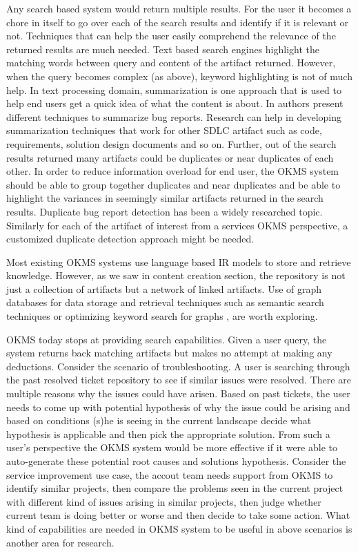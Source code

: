 Any search based system would return multiple results. For the user it becomes a chore in itself to go over each of the search results and identify if it is relevant or not. Techniques that can help the user easily comprehend the relevance of the returned results are much needed. Text based search engines highlight the matching words between query and content of the artifact returned. However, when the query becomes complex (as above), keyword highlighting is not of much help. In text processing domain, summarization is one approach that is used to help end users get a quick idea of what the content is about. In \cite{Mani:2012,Rastkar:2010} authors present different techniques to summarize bug reports. Research can help in developing summarization techniques that work for other SDLC artifact such as code, requirements, solution design documents and so on. Further, out of the search results returned many artifacts could be duplicates or near duplicates of each other. In order to reduce information overload for end user, the OKMS system should be able to group together duplicates and near duplicates and be able to highlight the variances in seemingly similar artifacts returned in the search results. Duplicate bug report detection \cite{wang2008approach,sun2010discriminative} has been a widely researched topic. Similarly for each of the artifact of interest from a services OKMS perspective, a customized duplicate detection approach might be needed. 

Most existing OKMS systems use language based IR models to store and retrieve knowledge. However, as we saw in content creation section, the repository is not just a collection of artifacts but a network of linked artifacts. Use of graph databases for data storage and retrieval techniques such as semantic search techniques \cite{Guha:2003} or optimizing keyword search for graphs \cite{kacholia2005bidirectional}, are worth exploring.

OKMS today stops at providing search capabilities. Given a user query, the system returns back matching artifacts but makes no attempt at making any deductions. Consider the scenario of troubleshooting. A user is searching through the past resolved ticket repository to see if similar issues were resolved. There are multiple reasons why the issues could have arisen. Based on past tickets, the user needs to come up with potential hypothesis of why the issue could be arising and based on conditions (s)he is seeing in the current landscape decide what hypothesis is applicable and then pick the appropriate solution. From such a user's perspective the OKMS system would be more effective if it were able to auto-generate these potential root causes and solutions hypothesis. Consider the service improvement use case, the accout team needs support from OKMS to identify similar projects, then compare the problems seen in the current project with different kind of issues arising in similar projects, then judge whether current team is doing better or worse and then decide to take some action. What kind of capabilities are needed in OKMS system to be useful in above scenarios is another area for research. 

